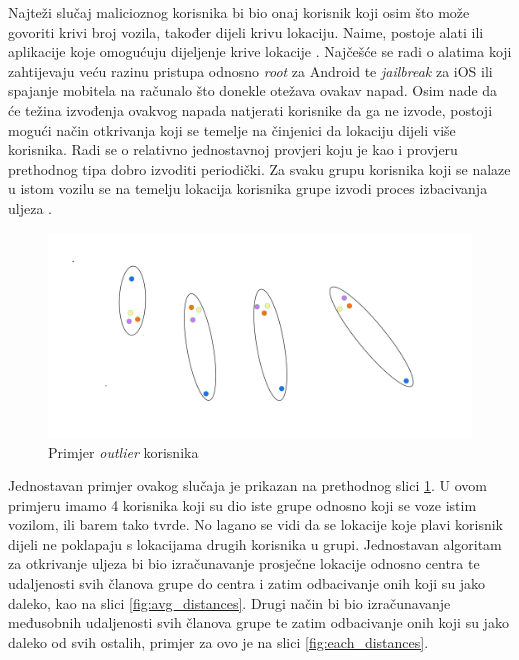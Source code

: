 \documentclass[times, utf8, diplomski]{fer}
\begin{document}
Najteži slučaj malicioznog korisnika bi bio onaj korisnik koji osim što može govoriti krivi broj vozila, također dijeli krivu lokaciju. Naime, postoje alati ili aplikacije koje omogućuju dijeljenje krive lokacije . Najčešće se radi o alatima koji zahtijevaju veću razinu pristupa odnosno \emph{root} za Android te \emph{jailbreak} za iOS ili spajanje mobitela na računalo što donekle otežava ovakav napad. Osim nade da će težina izvođenja ovakvog napada natjerati korisnike da ga ne izvode, postoji mogući način otkrivanja koji se temelje na činjenici da lokaciju dijeli više korisnika. Radi se o relativno jednostavnoj provjeri koju je kao i provjeru prethodnog tipa dobro izvoditi periodički. Za svaku grupu korisnika koji se nalaze u istom vozilu se na temelju lokacija korisnika grupe izvodi proces izbacivanja uljeza .

\begin{figure}[htb]
    \centering
    \includegraphics[width=1\textwidth]{images/outlier.png}
    \caption{Primjer \emph{outlier} korisnika}\label{fig:outlier}
\end{figure}

Jednostavan primjer ovakog slučaja je prikazan na prethodnog slici \ref{fig:outlier}. U ovom primjeru imamo 4 korisnika koji su dio iste grupe odnosno koji se voze istim vozilom, ili barem tako tvrde. No lagano se vidi da se lokacije koje plavi korisnik dijeli ne poklapaju s lokacijama drugih korisnika u grupi. Jednostavan algoritam za otkrivanje uljeza bi bio izračunavanje prosječne lokacije odnosno centra te udaljenosti svih članova grupe do centra i zatim odbacivanje onih koji su jako daleko, kao na slici \ref{fig:avg_distances}. Drugi način bi bio izračunavanje međusobnih udaljenosti svih članova grupe te zatim odbacivanje onih koji su jako daleko od svih ostalih, primjer za ovo je na slici \ref{fig:each_distances}.
\end{document}
